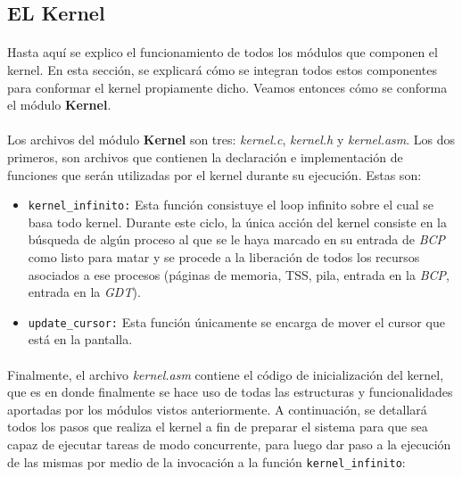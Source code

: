 \documentclass[11pt, a4paper]{article}
\begin{document}
\subsection{EL Kernel}
\label{kernel}	
	\paragraph{}
	Hasta aquí se explico el funcionamiento de todos los módulos que componen el kernel. En esta sección, se explicará cómo se integran todos estos componentes para conformar el kernel propiamente dicho. Veamos entonces cómo se conforma el módulo \textbf{Kernel}.
	
	\paragraph{} 
	Los archivos del módulo \textbf{Kernel} son tres: \textit{kernel.c}, \textit{kernel.h} y \textit{kernel.asm}. Los dos primeros, son archivos que contienen la declaración e implementación de funciones que serán utilizadas por el kernel durante su ejecución. Estas son:
	\begin{itemize}
		\item \texttt{kernel\_infinito:} Esta función consistuye el loop infinito sobre el cual se basa todo kernel. Durante este ciclo, la única acción del kernel consiste en la búsqueda de algún proceso al que se le haya marcado en su entrada de \textit{BCP} como listo para matar y se procede a la liberación de todos los recursos asociados a ese procesos (páginas de memoria, TSS, pila, entrada en la \textit{BCP}, entrada en la \textit{GDT}).
		\item \texttt{update\_cursor:} Esta función únicamente se encarga de mover el cursor que está en la pantalla.
	\end{itemize}
	
	\paragraph{}
	Finalmente, el archivo \textit{kernel.asm} contiene el código de inicialización del kernel, que es en donde finalmente se hace uso de todas las estructuras y funcionalidades aportadas por los módulos vistos anteriormente. A continuación, se detallará todos los pasos que realiza el kernel a fin de preparar el sistema para que sea capaz de ejecutar tareas de modo concurrente, para luego dar paso a la ejecución de las mismas por medio de la invocación a la función \texttt{kernel\_infinito}:
	
\end{document}
